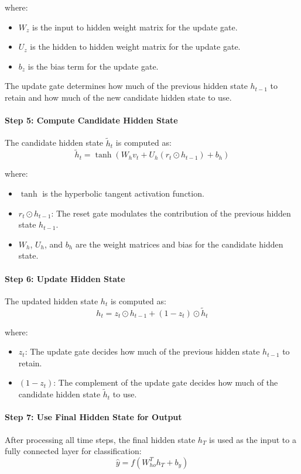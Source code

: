 \documentclass[12pt,a4paper]{article}
\begin{document}
where:
\begin{itemize}
    \item $W_z$ is the input to hidden weight matrix for the update gate.
    \item $U_z$ is the hidden to hidden weight matrix for the update gate.
    \item $b_z$ is the bias term for the update gate.
\end{itemize}
The update gate determines how much of the previous hidden state $h_{t-1}$ to retain and how much of the new candidate hidden state to use.

\paragraph{Step 5: Compute Candidate Hidden State}
The candidate hidden state $\tilde{h}_t$ is computed as:
\begin{equation}
    \tilde{h}_t = \tanh(W_h v_t + U_h (r_t \odot h_{t-1}) + b_h)    
\end{equation}

where:
\begin{itemize}
    \item $\tanh$ is the hyperbolic tangent activation function.
    \item $r_t \odot h_{t-1}$: The reset gate modulates the contribution of the previous hidden state $h_{t-1}$.
    \item $W_h$, $U_h$, and $b_h$ are the weight matrices and bias for the candidate hidden state.
\end{itemize}

\paragraph{Step 6: Update Hidden State}
The updated hidden state $h_t$ is computed as:
\begin{equation}
    h_t = z_t \odot h_{t-1} + (1 - z_t) \odot \tilde{h}_t    
\end{equation}

where:
\begin{itemize}
    \item $z_t$: The update gate decides how much of the previous hidden state $h_{t-1}$ to retain.
    \item $(1 - z_t)$: The complement of the update gate decides how much of the candidate hidden state $\tilde{h}_t$ to use.
\end{itemize}

\paragraph{Step 7: Use Final Hidden State for Output}
After processing all time steps, the final hidden state $h_T$ is used as the input to a fully connected layer for classification:
\begin{equation}
    \hat{y} = f(W_{ho}^T h_T + b_y)    
\end{equation}
\end{document}
